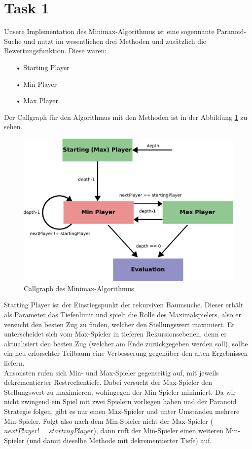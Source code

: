 \section{Task 1}
Unsere Implementation des Minimax-Algorithmus ist eine sogennante Paranoid-Suche und nutzt im wesentlichen drei Methoden und zusätzlich die Bewertungsfunktion. Diese wären:
\begin{enumerate}
\item[•]Starting Player
\item[•]Min Player
\item[•]Max Player
\end{enumerate}
Der Callgraph für den Algorithmus mit den Methoden ist in der Abbildung \ref{fig::callgraph-minimax} zu sehen.
\begin{figure}[h]
	\begin{center}
		\includegraphics[scale=0.25]{figures/MinMaxCallGraph.pdf}
		\caption{Callgraph des Minimax-Algorithmus}
		\label{fig::callgraph-minimax}
	\end{center}
\end{figure}
Starting Player ist der Einstiegspunkt der rekursiven Baumsuche. Dieser erhält als Parameter das Tiefenlimit und spielt die Rolle des Maximalspielers, also er versucht den besten Zug zu finden, welcher den Stellungswert maximiert. Er unterscheidet sich vom Max-Spieler in tieferen Rekursionsebenen, denn er aktualisiert den besten Zug (welcher am Ende zurückgegeben werden soll), sollte ein neu erforschter Teilbaum eine Verbesserung gegenüber den alten Ergebnissen liefern.\\
Ansonsten rufen sich Min- und Max-Spieler gegenseitig auf, mit jeweils dekrementierter Restrechentiefe. Dabei versucht der Max-Spieler den Stellungswert zu maximieren, wohingegen der Min-Spieler minimiert. Da wir nicht zwingend ein Spiel mit zwei Spielern vorliegen haben und der Paranoid Strategie folgen, gibt es nur einen Max-Spieler und unter Umständen mehrere Min-Spieler. Folgt also nach dem Min-Spieler nicht der Max-Spieler ($nextPlayer != startingPlayer$), dann ruft der Min-Spieler einen weiteren Min-Spieler (und damit dieselbe Methode mit dekrementierter Tiefe) auf.\\
